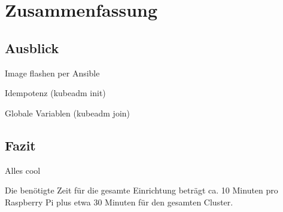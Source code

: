 \chapter{Zusammenfassung}\label{ch:zusammenfassung}

\section{Ausblick}\label{sec:ausblick}

Image flashen per Ansible

Idempotenz (kubeadm init)

Globale Variablen (kubeadm join)

\section{Fazit}\label{sec:fazit}

Alles cool

Die benötigte Zeit für die gesamte Einrichtung beträgt ca. 10 Minuten pro Raspberry Pi plus etwa 30 Minuten für den gesamten Cluster.

